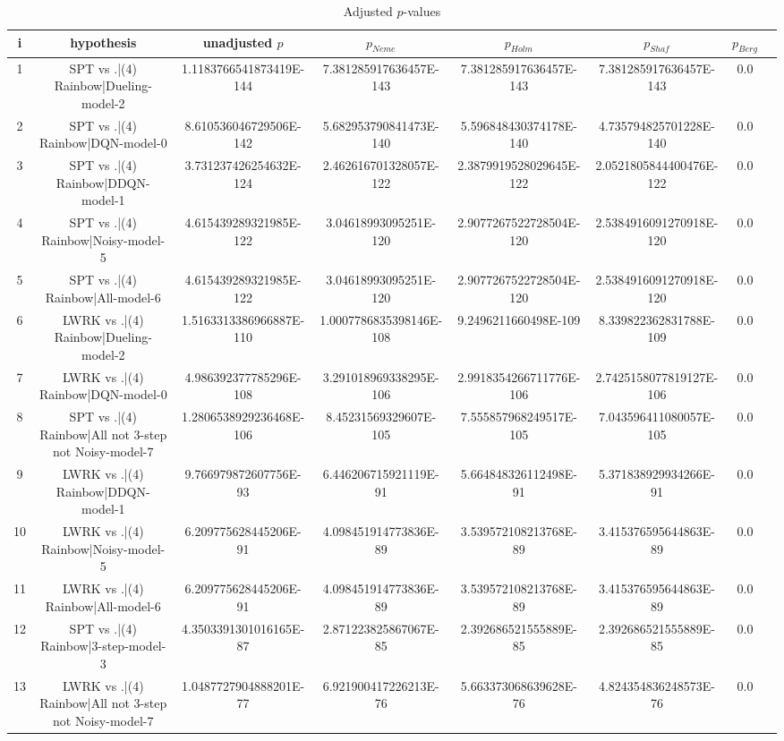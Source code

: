 \documentclass[a3paper,10pt]{article}
\begin{document}
\begin{table}[!htp]
\centering\tiny
\caption{Adjusted $p$-values}
\begin{tabular}{cccccccc}
i&hypothesis&unadjusted $p$&$p_{Neme}$&$p_{Holm}$&$p_{Shaf}$&$p_{Berg}$\\
\hline
1&SPT vs .|(4) Rainbow|Dueling-model-2&1.1183766541873419E-144&7.381285917636457E-143&7.381285917636457E-143&7.381285917636457E-143&0.0\\
2&SPT vs .|(4) Rainbow|DQN-model-0&8.610536046729506E-142&5.682953790841473E-140&5.596848430374178E-140&4.735794825701228E-140&0.0\\
3&SPT vs .|(4) Rainbow|DDQN-model-1&3.731237426254632E-124&2.462616701328057E-122&2.3879919528029645E-122&2.0521805844400476E-122&0.0\\
4&SPT vs .|(4) Rainbow|Noisy-model-5&4.615439289321985E-122&3.04618993095251E-120&2.9077267522728504E-120&2.5384916091270918E-120&0.0\\
5&SPT vs .|(4) Rainbow|All-model-6&4.615439289321985E-122&3.04618993095251E-120&2.9077267522728504E-120&2.5384916091270918E-120&0.0\\
6&LWRK vs .|(4) Rainbow|Dueling-model-2&1.5163313386966887E-110&1.0007786835398146E-108&9.2496211660498E-109&8.339822362831788E-109&0.0\\
7&LWRK vs .|(4) Rainbow|DQN-model-0&4.986392377785296E-108&3.291018969338295E-106&2.9918354266711776E-106&2.7425158077819127E-106&0.0\\
8&SPT vs .|(4) Rainbow|All not 3-step not Noisy-model-7&1.2806538929236468E-106&8.45231569329607E-105&7.555857968249517E-105&7.043596411080057E-105&0.0\\
9&LWRK vs .|(4) Rainbow|DDQN-model-1&9.766979872607756E-93&6.446206715921119E-91&5.664848326112498E-91&5.371838929934266E-91&0.0\\
10&LWRK vs .|(4) Rainbow|Noisy-model-5&6.209775628445206E-91&4.098451914773836E-89&3.539572108213768E-89&3.415376595644863E-89&0.0\\
11&LWRK vs .|(4) Rainbow|All-model-6&6.209775628445206E-91&4.098451914773836E-89&3.539572108213768E-89&3.415376595644863E-89&0.0\\
12&SPT vs .|(4) Rainbow|3-step-model-3&4.3503391301016165E-87&2.871223825867067E-85&2.392686521555889E-85&2.392686521555889E-85&0.0\\
13&LWRK vs .|(4) Rainbow|All not 3-step not Noisy-model-7&1.0487727904888201E-77&6.921900417226213E-76&5.663373068639628E-76&4.824354836248573E-76&0.0\\

\end{tabular}
\end{table}
\end{document}
